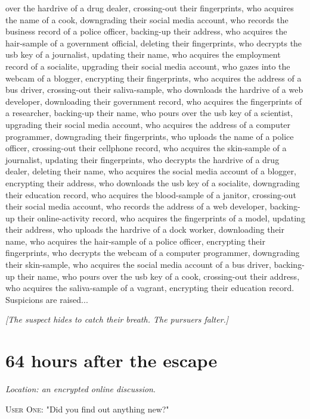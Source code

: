\documentclass{report}
\begin{document}
over the hardrive of a drug dealer, crossing-out their fingerprints, who acquires the name of a cook, downgrading their social media account, who records the business record of a police officer, backing-up their address, who acquires the hair-sample of a government official, deleting their fingerprints, who decrypts the usb key of a journalist, updating their name, who acquires the employment record of a socialite, upgrading their social media account, who gazes into the webcam of a blogger, encrypting their fingerprints, who acquires the address of a bus driver, crossing-out their saliva-sample, who downloads the hardrive of a web developer, downloading their government record, who acquires the fingerprints of a researcher, backing-up their name, who pours over the usb key of a scientist, upgrading their social media account, who acquires the address of a computer programmer, downgrading their fingerprints, who uploads the name of a police officer, crossing-out their cellphone record, who acquires the skin-sample of a journalist, updating their fingerprints, who decrypts the hardrive of a drug dealer, deleting their name, who acquires the social media account of a blogger, encrypting their address, who downloads the usb key of a socialite, downgrading their education record, who acquires the blood-sample of a janitor, crossing-out their social media account, who records the address of a web developer, backing-up their online-activity record, who acquires the fingerprints of a model, updating their address, who uploads the hardrive of a dock worker, downloading their name, who acquires the hair-sample of a police officer, encrypting their fingerprints, who decrypts the webcam of a computer programmer, downgrading their skin-sample, who acquires the social media account of a bus driver, backing-up their name, who pours over the usb key of a cook, crossing-out their address, who acquires the saliva-sample of a vagrant, encrypting their education record. Suspicions are raised...

\textit{[The suspect hides to catch their breath. The pursuers falter.]}


\section*{64 \small{hours after the escape}}

\textit{Location: an encrypted online discussion}. 

\textsc{User One}: "Did you find out anything new?" 
\end{document}
